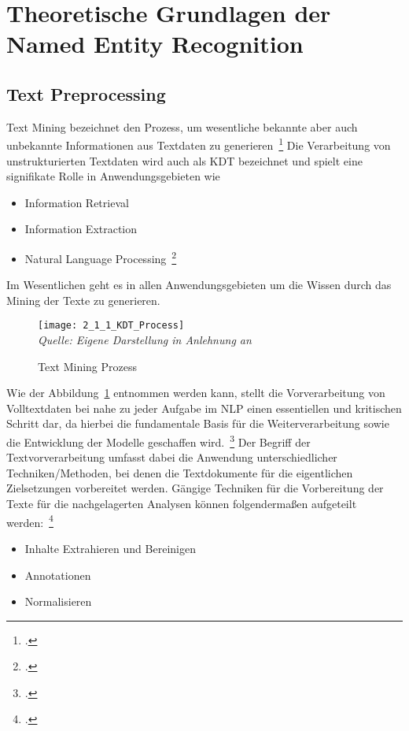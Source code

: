 \newpage
\section{Theoretische Grundlagen der Named Entity Recognition} \label{sec:Grundlagen}

\subsection{Text Preprocessing}\label{sec:TextPreprocessing}
Text Mining bezeichnet den Prozess, um wesentliche bekannte aber auch unbekannte Informationen aus Textdaten zu
generieren~\footcite[\vglf][]{mohan.2015}
Die Verarbeitung von unstrukturierten Textdaten wird auch als \ac{KDT}
bezeichnet und spielt eine signifikate Rolle in Anwendungsgebieten wie

\begin{itemize}
    \item Information Retrieval
    \item Information Extraction
    \item Natural Language Processing~\footcite[\vglf][ f.]{mohan.2015}
\end{itemize}
Im Wesentlichen geht es in allen \og Anwendungsgebieten um die Wissen durch das Mining der Texte zu generieren.

\begin{figure}[H]
    \caption{Text Mining Prozess}\label{fig:2_1_1_KDT_Process}
    \texttt{[image: 2\_1\_1\_KDT\_Process]}
    \\
    \textit{Quelle: Eigene Darstellung in Anlehnung an}~\cite[]{mohan.2015}
\end{figure}

Wie der Abbildung~\ref{fig:2_1_1_KDT_Process} entnommen werden kann, stellt die Vorverarbeitung von Volltextdaten bei nahe
zu jeder Aufgabe im \ac{NLP} einen essentiellen und kritischen Schritt dar,
da hierbei die fundamentale Basis für die Weiterverarbeitung
sowie die Entwicklung der Modelle geschaffen wird.~\footcite[\vglf][]{gurusamy.2014}
Der Begriff der Textvorverarbeitung umfasst dabei die Anwendung unterschiedlicher Techniken/Methoden, bei
denen die Textdokumente für die eigentlichen Zielsetzungen vorbereitet werden.
Gängige Techniken für die Vorbereitung der Texte für die nachgelagerten Analysen können folgendermaßen aufgeteilt
werden:~\footcite[\vglf][]{pahwa.2018}

\begin{itemize}
    \item Inhalte Extrahieren und Bereinigen
    \item Annotationen
    \item Normalisieren
\end{itemize}


